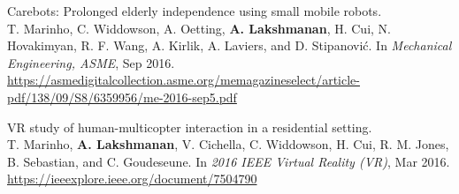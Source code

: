 \documentclass[11pt]{article}
\newenvironment{lonelist}[1][\enskip\textbullet]%
        {\vspace{-\baselineskip}\begin{list}{#1}{%
        \setlength{\partopsep}{0pt}%
        \setlength{\topsep}{0pt}}}
        {\end{list}\vspace{-.6\baselineskip}}
\begin{document}
\begin{lonelist}
\item[] Carebots: Prolonged elderly independence using small mobile robots. \\
T. Marinho, C. Widdowson, A. Oetting, \textbf{A. Lakshmanan}, H. Cui, N. Hovakimyan, R. F. Wang, A. Kirlik, A. Laviers, and D. Stipanović. In \textit{Mechanical Engineering, ASME}, Sep 2016. \url{https://asmedigitalcollection.asme.org/memagazineselect/article-pdf/138/09/S8/6359956/me-2016-sep5.pdf} \bigskip

\item[] VR study of human-multicopter interaction in a residential setting. \\
T. Marinho, \textbf{A. Lakshmanan}, V. Cichella, C. Widdowson, H. Cui, R. M. Jones, B. Sebastian, and C. Goudeseune. In \textit{2016 IEEE Virtual Reality (VR)}, Mar 2016. \url{https://ieeexplore.ieee.org/document/7504790} 

\end{lonelist}
\end{document}

